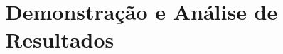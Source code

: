 \documentclass{article}
\begin{document}












 









\section{Demonstração e Análise de Resultados}
\end{document}
